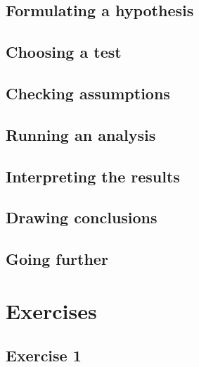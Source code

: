 \documentclass[english,10pt,a4paper,oneside]{book}
\begin{document}
\hypertarget{formulating-a-hypothesis}{%
\subsection{Formulating a hypothesis}\label{formulating-a-hypothesis}}

\hypertarget{choosing-a-test}{%
\subsection{Choosing a test}\label{choosing-a-test}}

\hypertarget{checking-assumptions}{%
\subsection{Checking assumptions}\label{checking-assumptions}}

\hypertarget{running-an-analysis}{%
\subsection{Running an analysis}\label{running-an-analysis}}

\hypertarget{interpreting-the-results}{%
\subsection{Interpreting the results}\label{interpreting-the-results}}

\hypertarget{drawing-conclusions}{%
\subsection{Drawing conclusions}\label{drawing-conclusions}}

\hypertarget{going-further}{%
\subsection{Going further}\label{going-further}}

\hypertarget{exercises-3}{%
\section{Exercises}\label{exercises-3}}

\hypertarget{exercise-1-3}{%
\subsection{Exercise 1}\label{exercise-1-3}}
\end{document}
